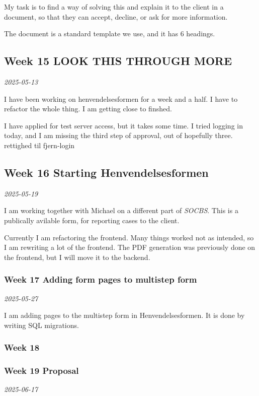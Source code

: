 \documentclass[../main.tex]{subfiles}
\begin{document}
My task is to find a way of solving this and explain it to the client in a document, so that they can accept, decline, or ask for more information.

The document is a standard template we use, and it has 6 headings.

\subsection{Week 15 LOOK THIS THROUGH MORE}
\textit{2025-05-13}

I have been working on henvendelsesformen for a week and a half. I have to refactor the whole thing. I am getting close to finshed.

I have applied for test server access, but it takes some time. I tried logging in today, and I am missing the third step of approval, out of hopefully three. rettighed til fjern-login

\subsection{Week 16 Starting Henvendelsesformen}

\textit{2025-05-19}

I am working together with Michael on a different part of \textit{SOCBS}. This is a publically avilable form, for reporting cases to the client. 

Currently I am refactoring the frontend. Many things worked not as intended, so I am rewriting a lot of the frontend. The PDF generation was previously done on the frontend, but I will move it to the backend.

\subsubsection{Week 17 Adding form pages to multistep form}

\textit{2025-05-27}

I am adding pages to the multistep form in Henvendelsesformen. It is done by writing SQL migrations. 

\subsubsection{Week 18 }
\subsubsection{Week 19 Proposal}

\textit{2025-06-17}
\end{document}
